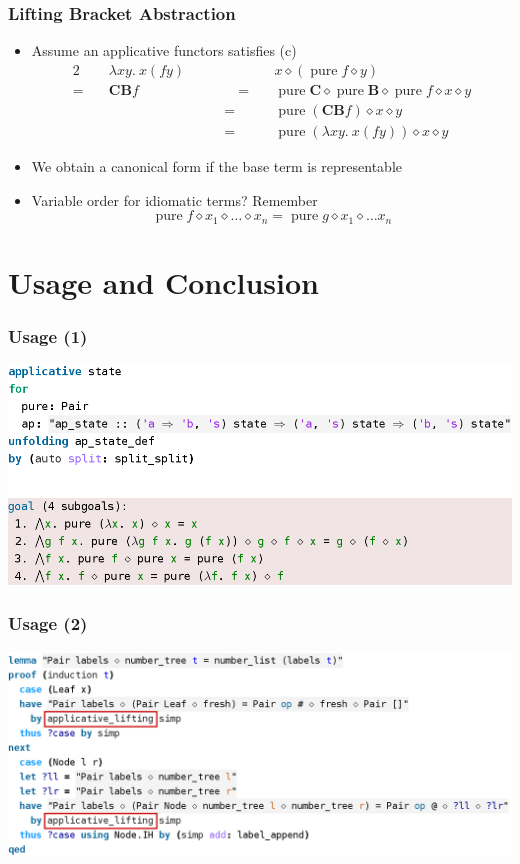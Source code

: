 \documentclass[smaller,leqno]{beamer}
\DeclareMathOperator{\pure}{pure}
\newcommand{\ap}{\diamond}
\begin{document}
\begin{frame}
\frametitle{Lifting Bracket Abstraction}

\begin{itemize}
\item Assume an applicative functors satisfies (c)
\begin{alignat*}{2}
\quad& \lambda x y.\> x (f y) & \quad& x \ap (\pure f \ap y) \\
=\quad& \mathbf{C B} f & \quad\qquad=\quad& \pure \mathbf{C} \ap \pure \mathbf{B} \ap \pure f \ap x \ap y \\
& & \qquad=\quad& \pure{(\mathbf{C B} f)} \ap x \ap y \\
& & \qquad=\quad& \pure{(\lambda x y.\> x (f y))} \ap x \ap y
\end{alignat*}

\item We obtain a canonical form if the base term is representable
\pause\item Variable order for idiomatic terms? Remember
\[ \pure f \ap x_1 \ap \dots \ap x_n = \pure g \ap x_1 \ap \dots x_n \]
\end{itemize}
\end{frame}

\section{Usage and Conclusion} %

\begin{frame}
\frametitle{Usage (1)}
\begin{center}
\includegraphics[width=\textwidth]{screenshot1.png}
\end{center}
\end{frame}

\begin{frame}
\frametitle{Usage (2)}
\begin{center}
\includegraphics[width=\textwidth]{screenshot2.png}
\end{center}
\end{frame}
\end{document}
